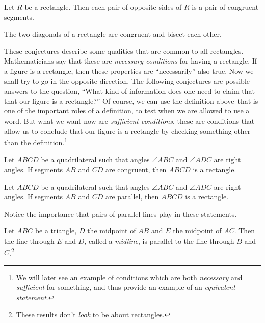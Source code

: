 \begin{conjecture}\label{conj:rectangle-opp-sides}
Let $R$ be a rectangle. Then each pair of opposite sides of $R$ is a pair of congruent segments.
\end{conjecture}

\begin{conjecture}\label{conj:rectangle-diagonals}
The two diagonals of a rectangle are congruent and bisect each other.
\end{conjecture}


These conjectures describe some qualities that are common to all rectangles. Mathematicians say that these are \emph{necessary conditions} for having a rectangle.
If a figure is a rectangle, then these properties are ``necessarily'' also true. Now we shall try to go in the opposite direction.
The following conjectures are possible answers to the question, ``What kind of information does one need to claim that that our figure is a rectangle?''
Of course, we can use the definition above--that is one of the important roles of a definition, to test when we are allowed to use a word.
But what we want now are \emph{sufficient conditions}, these are conditions that allow us to conclude that our figure is a rectangle by checking something other than the definition.\footnote{We will later see an example of conditions which are both
\emph{necessary} and \emph{sufficient} for something, and thus provide an example of an \emph{equivalent statement}.}




\begin{conjecture}\label{conj:opp-congruent-implies-rectangle}
Let $ABCD$ be a quadrilateral such that angles $\angle ABC$ and $\angle ADC$ are right angles.
If segments $AB$ and $CD$ are congruent, then $ABCD$ is a rectangle.
\end{conjecture}

\begin{conjecture}\label{conj:opp-parallel-implies-rectangle}
Let $ABCD$ be a quadrilateral such that angles $\angle ABC$ and $\angle ADC$ are right angles.
If segments $AB$ and $CD$ are parallel, then $ABCD$ is a rectangle.
\end{conjecture}

Notice the importance that pairs of parallel lines play in these statements.



\begin{conjecture} \label{conj:midline-theorem}
Let $ABC$ be a triangle, $D$ the midpoint of $AB$ and $E$ the midpoint of $AC$.
Then the line through $E$ and $D$, called a \emph{midline}, is parallel to the line through $B$ and $C$.\footnote{These results don't \emph{look} to be about rectangles.}

\end{conjecture}

